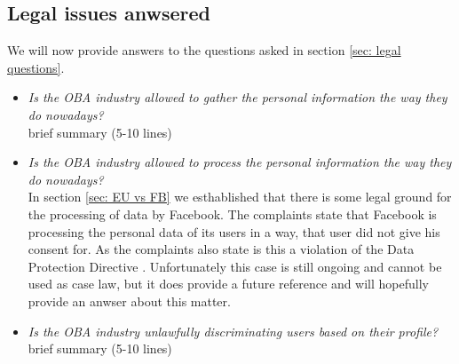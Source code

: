 \documentclass[11pt]{article}
\newcommand{\DPD}{Data Protection Directive }
\begin{document}
\subsection{Legal issues anwsered}
We will now provide answers to the questions asked in section \ref{sec: legal questions}.

\begin{itemize}
	\item \textit{Is the OBA industry allowed to gather the personal information the way they do nowadays?}\\
			brief summary (5-10 lines)
	\item \textit{Is the OBA industry allowed to process the personal information the way they do nowadays?}\\
In section \ref{sec: EU vs FB} we esthablished that there is some legal ground for the processing of data by Facebook. The complaints state that Facebook is processing the personal data of its users in a way, that user did not give his consent for. As the complaints also state is this a violation of the \DPD. Unfortunately this case is still ongoing and cannot be used as case law, but it does provide a future reference and will hopefully provide an anwser about this matter.
			
	\item \textit{Is the OBA industry unlawfully discriminating users based on their profile?}\\
			brief summary (5-10 lines)
\end{itemize}





\end{document}
